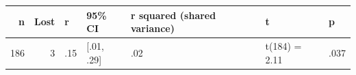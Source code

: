 \begin{tabular}{rrlllll}
  \toprule
n & Lost & r & 95\% CI & r squared (shared variance) & t & p \\ 
  \midrule
186 &   3 & .15 & [.01, .29] & .02 & t(184) = 2.11 & .037 \\ 
   \bottomrule
\end{tabular}
